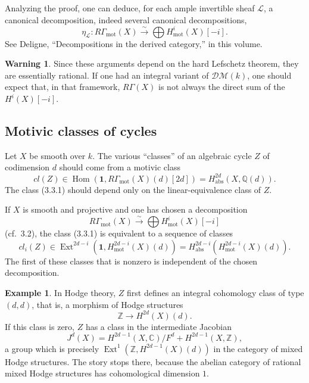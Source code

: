 \documentclass[11pt,a4paper]{article}
\theoremstyle{plain}
\theoremstyle{definition}
\newtheorem{example}[theorem]{Example}
\newtheorem{remark}[theorem]{Warning}
\DeclareMathOperator{\Ext}{Ext}
\DeclareMathOperator{\Hom}{Hom}
\newcommand{\Q}{\mathbb{Q}}
\newcommand{\Z}{\mathbb{Z}}
\newcommand{\C}{\mathbb{C}}
\DeclareMathOperator{\mot}{mot}
\newcommand{\abs}{\mathrm{abs}}
\begin{document}
Analyzing the proof, one can deduce, for each ample invertible sheaf $\mathscr{L}$, a canonical decomposition, indeed several canonical decompositions,
$$
\eta_{\mathscr{L}}:R\Gamma_{\mot}(X)\xrightarrow{\sim}\bigoplus H^i_{\mot}(X)[-i].
$$
See Deligne, ``Decompositions in the derived category,'' in this volume.

\begin{remark}
Since these arguments depend on the hard Lefschetz theorem, they are essentially rational. If one had an integral variant of $\mathscr{D}\mathcal{M}(k)$, one should expect that, in that framework, $R\Gamma(X)$ is not always the direct sum of the $H^i(X)[-i]$.
\end{remark}

\subsection{Motivic classes of cycles}

Let $X$ be smooth over $k$. The various ``classes'' of an algebraic cycle $Z$ of codimension $d$ should come from a motivic class
\begin{equation}
\tag{3.3.1}
cl(Z)\in\Hom(\mathbf{1},R\Gamma_{\mot}(X)(d)[2d])=H^{2d}_{\abs}(X,\Q(d)).
\end{equation}
The class (3.3.1) should depend only on the linear-equivalence class of $Z$.

If $X$ is smooth and projective and one has chosen a decomposition
\begin{equation}
\tag{$*$}
R\Gamma_{\mot}(X)\xrightarrow{\sim}\bigoplus H^i_{\mot}(X)[-i]
\end{equation}
(cf.~3.2), the class (3.3.1) is equivalent to a sequence of classes
\begin{equation}
\tag{3.3.2}
cl_i(Z)\in\Ext^{2d-i}(\mathbf{1},H^{2d-i}_{\mot}(X)(d))=H^{2d-i}_{\abs}(H^{2d-i}_{\mot}(X)(d)).
\end{equation}
The first of these classes that is nonzero is independent of the chosen decomposition.

\begin{example}
In Hodge theory, $Z$ first defines an integral cohomology class of type $(d,d)$, that is, a morphism of Hodge structures
$$
\Z\to H^{2d}(X)(d).
$$
If this class is zero, $Z$ has a class in the intermediate Jacobian
$$
J^d(X)=H^{2d-1}(X,\C)/F^d+H^{2d-1}(X,\Z),
$$
a group which is precisely $\Ext^1(\Z,H^{2d-1}(X)(d))$ in the category of mixed Hodge structures. The story stops there, because the abelian category of rational mixed Hodge structures has cohomological dimension $1$.
\end{example}
\end{document}
